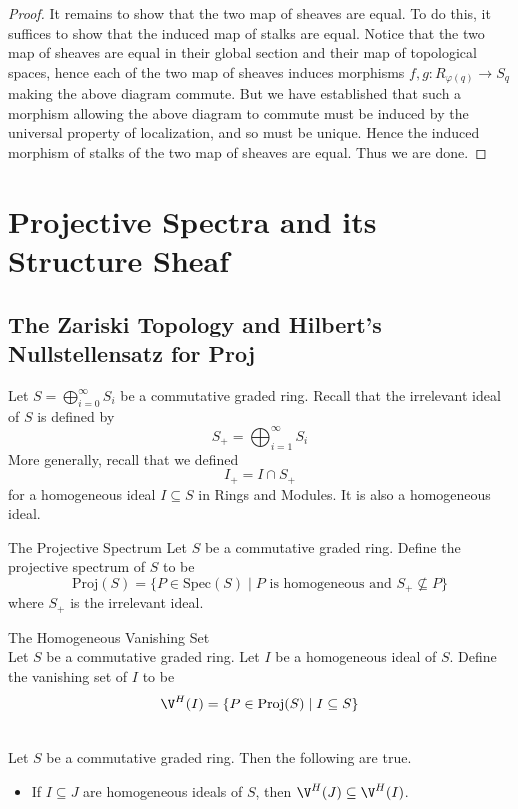 \documentclass[a4paper]{article}
\begin{document}
\begin{prp}{}{}
\begin{proof}
It remains to show that the two map of sheaves are equal. To do this, it suffices to show that the induced map of stalks are equal. Notice that the two map of sheaves are equal in their global section and their map of topological spaces, hence each of the two map of sheaves induces morphisms $f,g:R_{\varphi(q)}\to S_q$ making the above diagram commute. But we have established that such a morphism allowing the above diagram to commute must be induced by the universal property of localization, and so must be unique. Hence the induced morphism of stalks of the two map of sheaves are equal. Thus we are done. 
\end{proof}
\end{prp}

\pagebreak
\section{Projective Spectra and its Structure Sheaf}
\subsection{The Zariski Topology and Hilbert's Nullstellensatz for Proj}
Let $S=\bigoplus_{i=0}^\infty S_i$ be a commutative graded ring. Recall that the irrelevant ideal of $S$ is defined by $$S_+=\bigoplus_{i=1}^\infty S_i$$ More generally, recall that we defined $$I_+=I\cap S_+$$ for a homogeneous ideal $I\subseteq S$ in Rings and Modules. It is also a homogeneous ideal. 

\begin{defn}{The Projective Spectrum}{} Let $S$ be a commutative graded ring. Define the projective spectrum of $S$ to be $$\text{Proj}(S)=\{P\in\text{Spec}(S)\;|\;P\text{ is homogeneous and }S_+\not\subseteq P\}$$ where $S_+$ is the irrelevant ideal. 
\end{defn}

\begin{defn}{The Homogeneous Vanishing Set}{}\\
Let $S$ be a commutative graded ring. Let $I$ be a homogeneous ideal of $S$. Define the vanishing set of $I$ to be $$\V^H(I)=\{P\in\text{Proj}(S)\;|\;I\subseteq S\}$$
\end{defn}

\begin{lmm}{}{}\\
Let $S$ be a commutative graded ring. Then the following are true. 
\begin{itemize}
\item If $I\subseteq J$ are homogeneous ideals of $S$, then $\V^H(J)\subseteq \V^H(I)$. 
\end{itemize}
\end{lmm}
\end{document}
